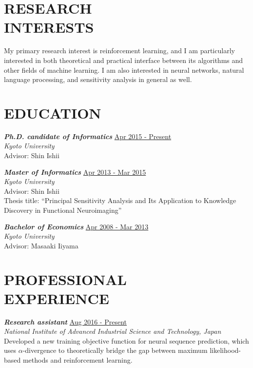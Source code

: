 \documentclass[margin, 10pt]{res} %
\begin{document}
\begin{resume}

\section{{\small RESEARCH\\INTERESTS}}

My primary research interest is reinforcement learning, and I am particularly interested in both theoretical and practical interface between its algorithms and other fields of machine learning. I am also interested in neural networks, natural language processing, and sensitivity analysis in general as well.

\section{{\small EDUCATION}}

{\sl {\bf Ph.D. candidate of Informatics}} \hfill {\small \underline{Apr 2015 - Present}} \\
{\it Kyoto University} \\
Advisor: Shin Ishii

{\sl {\bf Master of Informatics}} \hfill {\small \underline{Apr 2013 - Mar 2015}}  \\
{\it Kyoto University} \\
Advisor: Shin Ishii \\
Thesis title: ``Principal Sensitivity Analysis and Its Application to Knowledge Discovery in Functional Neuroimaging''

{\sl {\bf Bachelor of Economics}} \hfill {\small \underline{Apr 2008 - Mar 2013}} \\
{\it Kyoto University} \\
Advisor: Masaaki Iiyama
  
\section{{\small PROFESSIONAL\\EXPERIENCE}}

{\sl {\bf Research assistant}} \hfill {\small \underline{Aug 2016 - Present}} \\
{\it National Institute of Advanced Industrial Science and Technology, Japan} \\
Developed a new training objective function for neural sequence prediction, which uses $\alpha$-divergence to theoretically bridge the gap between maximum likelihood-based methods and reinforcement learning.


\end{resume}
\end{document}
